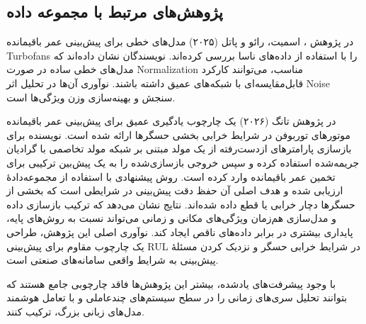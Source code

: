 \subsection{پژوهش‌های مرتبط با مجموعه داده }

در پژوهش
 \cite{smith2025cmapsslinear}،
اسمیت، رائو و پاتل (۲۰۲۵)
    مدل‌های خطی برای پیش‌بینی عمر باقیمانده 
    \glspl{Turbofan}
     را با استفاده از داده‌های 
	  ناسا بررسی کرده‌اند. نویسندگان نشان داده‌اند که مدل‌های خطی ساده در صورت \gls{Normalization} مناسب، می‌توانند کارکرد قابل‌مقایسه‌ای با شبکه‌های عمیق داشته باشند. نوآوری آن‌ها در تحلیل اثر \gls{Noise} سنجش و بهینه‌سازی وزن ویژگی‌ها است.

	

در پژوهش
تانگ (۲۰۲۶)
\cite{tang2026sensorfailure}
یک چارچوب یادگیری عمیق برای پیش‌بینی عمر باقیمانده موتورهای توربوفن در شرایط خرابی بخشی حسگرها ارائه شده است. نویسنده برای بازسازی پارامترهای ازدست‌رفته از یک مولد مبتنی بر شبکه مولد تخاصمی با گرادیان جریمه‌شده استفاده کرده و سپس خروجی بازسازی‌شده را به یک پیش‌بین ترکیبی
برای تخمین عمر باقیمانده وارد کرده است. روش پیشنهادی با استفاده از مجموعه‌دادهٔ  ارزیابی شده و هدف اصلی آن حفظ دقت پیش‌بینی در شرایطی است که بخشی از حسگرها دچار خرابی یا قطع داده شده‌اند. نتایج نشان می‌دهد که ترکیب بازسازی داده و مدل‌سازی هم‌زمان ویژگی‌های مکانی و زمانی می‌تواند نسبت به روش‌های پایه، پایداری بیشتری در برابر داده‌های ناقص ایجاد کند. نوآوری اصلی این پژوهش، طراحی یک چارچوب مقاوم برای پیش‌بینی \gls{RUL} در شرایط خرابی حسگر و نزدیک کردن مسئلهٔ پیش‌بینی به شرایط واقعی سامانه‌های صنعتی است.




با وجود پیشرفت‌های یادشده، بیشتر این پژوهش‌ها فاقد چارچوبی جامع هستند که بتوانند تحلیل سری‌های زمانی را در سطح سیستم‌های چندعاملی و با تعامل هوشمند مدل‌های زبانی بزرگ، ترکیب کنند.




